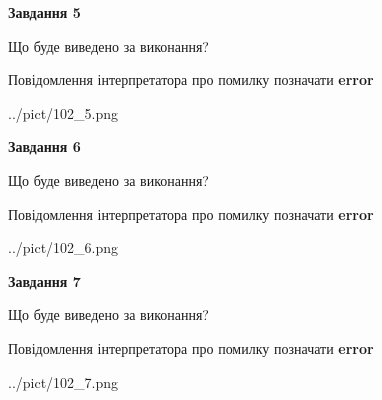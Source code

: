 \documentclass[10pt, ukrainian]{article}
\begin{document}
{\begin {large}
{\begin {center}\textbf{Завдання 5}\end {center}}\par
Що буде виведено за виконання? \par
Повідомлення інтерпретатора про помилку позначати \textbf{error}

\begin{center}
	{../pict/102_5.png}
\end{center}
\newpage

{\begin {center}\textbf{Завдання 6}\end {center}}\par
Що буде виведено за виконання? \par
Повідомлення інтерпретатора про помилку позначати \textbf{error}

\begin{center}
	{../pict/102_6.png}
\end{center}
\newpage

{\begin {center}\textbf{Завдання 7}\end {center}}\par
Що буде виведено за виконання? \par
Повідомлення інтерпретатора про помилку позначати \textbf{error}

\begin{center}
	{../pict/102_7.png}
\end{center}
\newpage

\end {large}}
\end{document}
